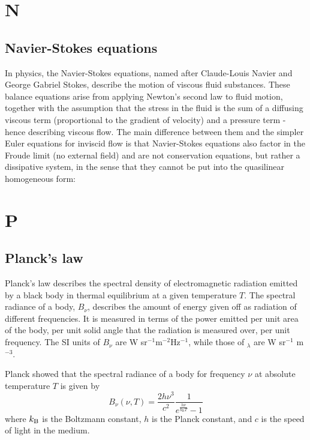 \documentclass[11pt]{article}
\begin{document}
\section*{N}
\subsection*{Navier-Stokes equations}
In physics, the Navier-Stokes equations, named after Claude-Louis Navier and George Gabriel Stokes, describe the motion of viscous fluid substances. These balance equations arise from applying Newton's second law to fluid motion, together with the assumption that the stress in the fluid is the sum of a diffusing viscous term (proportional to the gradient of velocity) and a pressure term - hence describing viscous flow. The main difference between them and the simpler Euler equations for inviscid flow is that Navier-Stokes equations also factor in the Froude limit (no external field) and are not conservation equations, but rather a dissipative system, in the sense that they cannot be put into the quasilinear homogeneous form:


\section*{P}
    \subsection*{Planck's law}
    Planck's law describes the spectral density of electromagnetic
    radiation emitted by a black body in thermal equilibrium at a given
    temperature $T$.  The spectral radiance of a body, $B_{\nu}$, describes the
    amount of energy given off as radiation of different 
    frequencies. It is measured in terms of the power emitted per unit
    area of the body, per unit solid angle that the radiation is measured
    over, per unit frequency. 
    The SI units of $B_{\nu}$ are W sr$^{-1}$m$^{-2}$Hz$^{-1}$,
    while those of $_{\lambda}$ are W sr$^{-1}$ m$^{-3}$.

    Planck showed that the spectral radiance of a body for frequency $\nu$ at absolute temperature $T$ is given by
    \begin{equation}
      B_{\nu }(\nu ,T)={\frac {2h\nu ^{3}}{c^{2}}}{\frac {1}{e^{\frac {h\nu }{k_{\mathrm {B} }T}}-1}}
    \end{equation}
    where $k_{\rm B}$ is the Boltzmann constant, $h$ is the Planck constant, and $c$ is the speed of light in the medium. 
\end{document}
